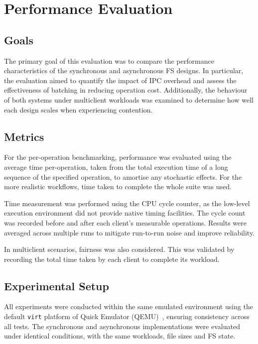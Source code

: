 \section{Performance Evaluation}

\subsection{Goals}

The primary goal of this evaluation was to compare the performance characteristics of the synchronous and asynchronous FS designs. In particular, the evaluation aimed to quantify the impact of IPC overhead and assess the effectiveness of batching in reducing operation cost. Additionally, the behaviour of both systems under multiclient workloads was examined to determine how well each design scales when experiencing contention.

\subsection{Metrics}

For the per-operation benchmarking, performance was evaluated using the average time per-operation, taken from the total execution time of a long sequence of the specified operation, to amortise any stochastic effects. For the more realistic workflows, time taken to complete the whole suite was used.

Time measurement was performed using the CPU cycle counter, as the low-level execution environment did not provide native timing facilities. The cycle count was recorded before and after each client’s measurable operations. Results were averaged across multiple runs to mitigate run-to-run noise and improve reliability.

In multiclient scenarios, fairness was also considered. This was validated by recording the total time taken by each client to complete its workload.

\subsection{Experimental Setup}

All experiments were conducted within the same emulated environment using the default \texttt{virt} platform of Quick Emulator (QEMU)~\cite{qemu}, ensuring consistency across all tests. The synchronous and asynchronous implementations were evaluated under identical conditions, with the same workloads, file sizes and FS state.

